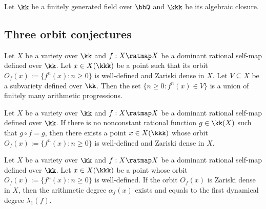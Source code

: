 Let \(\kk\) be a finitely generated field over \(\bbQ\) and \(\kkk\) be its algebraic closure.

\subsection{Three orbit conjectures}

    \begin{conjecture}\label{conj:Dynamical_Mordell_Lang_conjecture}
        Let \(X\) be a variety over \(\kk\) and \(f: X \ratmap X\) be a dominant rational self-map defined over \(\kk\).
        Let \(x \in X(\kkk)\) be a point such that its orbit \(O_f(x) := \{f^n(x) : n \geq 0\}\) is well-defined and Zariski dense in \(X\).
        Let \(V \subseteq X\) be a subvariety defined over \(\kk\).
        Then the set \(\{n \geq 0 : f^n(x) \in V\}\) is a union of finitely many arithmetic progressions.
        \Yang{}
    \end{conjecture}

    \begin{conjecture}\label{conj:Zariski_dense_orbit_conjecture}
        Let \(X\) be a variety over \(\kk\) and \(f: X \ratmap X\) be a dominant rational self-map defined over \(\kk\).
        If there is no nonconstant rational function \(g \in \kk(X)\) such that \(g \circ f = g\),
        then there exists a point \(x \in X(\kkk)\) whose orbit \(O_f(x) := \{f^n(x) : n \geq 0\}\) is well-defined and Zariski dense in \(X\).
        \Yang{}
    \end{conjecture}

    \begin{conjecture}\label{conj:Kawaguchi_Silverman_conjecture}
        Let \(X\) be a variety over \(\kk\) and \(f: X \ratmap X\) be a dominant rational self-map defined over \(\kk\).
        Let \(x \in X(\kkk)\) be a point whose orbit \(O_f(x) := \{f^n(x) : n \geq 0\}\) is well-defined.
        If the orbit \(O_f(x)\) is Zariski dense in \(X\),
        then the arithmetic degree \(\alpha_f(x)\) exists and equals to the first dynamical degree \(\lambda_1(f)\).
        \Yang{}
    \end{conjecture}
